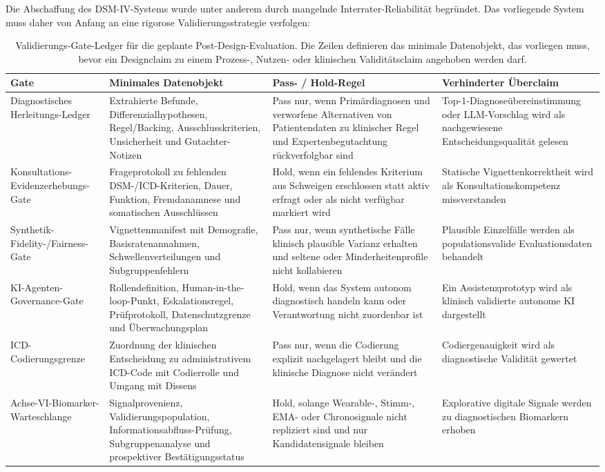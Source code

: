 \documentclass[11pt,a4paper]{article}
\begin{document}
Die Abschaffung des DSM-IV-Systems wurde unter anderem durch mangelnde Interrater-Reliabilit\"at begr\"undet. Das vorliegende System muss daher von Anfang an eine rigorose Validierungsstrategie verfolgen:

\begin{table}[htbp]
\centering
\caption{Validierungs-Gate-Ledger f\"ur die geplante Post-Design-Evaluation. Die Zeilen definieren das minimale Datenobjekt, das vorliegen muss, bevor ein Designclaim zu einem Prozess-, Nutzen- oder klinischen Validit\"atsclaim angehoben werden darf.}
\scriptsize
\renewcommand{\arraystretch}{1.15}
\begin{tabularx}{\textwidth}{@{}L{2.7cm}Y Y Y@{}}
\toprule
Gate & Minimales Datenobjekt & Pass- / Hold-Regel & Verhinderter \"Uberclaim \\
\midrule
Diagnostisches Herleitungs-Ledger & Extrahierte Befunde, Differenzialhypothesen, Regel/Backing, Ausschlusskriterien, Unsicherheit und Gutachter-Notizen & Pass nur, wenn Prim\"ardiagnosen und verworfene Alternativen von Patientendaten zu klinischer Regel und Expertenbegutachtung r\"uckverfolgbar sind & Top-1-Diagnose\"ubereinstimmung oder LLM-Vorschlag wird als nachgewiesene Entscheidungsqualit\"at gelesen \\
Konsultations-Evidenzerhebungs-Gate & Frageprotokoll zu fehlenden DSM-/ICD-Kriterien, Dauer, Funktion, Fremdanamnese und somatischen Ausschl\"ussen & Hold, wenn ein fehlendes Kriterium aus Schweigen erschlossen statt aktiv erfragt oder als nicht verf\"ugbar markiert wird & Statische Vignettenkorrektheit wird als Konsultationskompetenz missverstanden \\
Synthetik-Fidelity-/Fairness-Gate & Vignettenmanifest mit Demografie, Basisratenannahmen, Schwellenverteilungen und Subgruppenfehlern & Pass nur, wenn synthetische F\"alle klinisch plausible Varianz erhalten und seltene oder Minderheitenprofile nicht kollabieren & Plausible Einzelf\"alle werden als populationsvalide Evaluationsdaten behandelt \\
KI-Agenten-Governance-Gate & Rollendefinition, Human-in-the-loop-Punkt, Eskalationsregel, Pr\"ufprotokoll, Datenschutzgrenze und \"Uberwachungsplan & Hold, wenn das System autonom diagnostisch handeln kann oder Verantwortung nicht zuordenbar ist & Ein Assistenzprototyp wird als klinisch validierte autonome KI dargestellt \\
ICD-Codierungsgrenze & Zuordnung der klinischen Entscheidung zu administrativem ICD-Code mit Codierrolle und Umgang mit Dissens & Pass nur, wenn die Codierung explizit nachgelagert bleibt und die klinische Diagnose nicht ver\"andert & Codiergenauigkeit wird als diagnostische Validit\"at gewertet \\
Achse-VI-Biomarker-Warteschlange & Signalprovenienz, Validierungspopulation, Informationsabfluss-Pr\"ufung, Subgruppenanalyse und prospektiver Best\"atigungsstatus & Hold, solange Wearable-, Stimm-, EMA- oder Chronosignale nicht repliziert sind und nur Kandidatensignale bleiben & Explorative digitale Signale werden zu diagnostischen Biomarkern erhoben \\
\bottomrule
\end{tabularx}
\label{tab:validierungs-gate-ledger}
\normalsize
\end{table}
\end{document}
